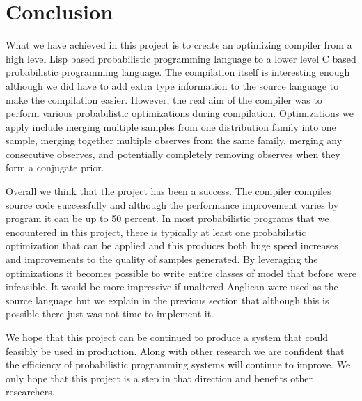 \documentclass[a4paper]{article}
\begin{document}

\section{Conclusion}

What we have achieved in this project is to create an optimizing compiler from a high level Lisp based probabilistic programming language to a lower level C based probabilistic programming language. The compilation itself is interesting enough although we did have to add extra type information to the source language to make the compilation easier. However, the real aim of the compiler was to perform various probabilistic optimizations during compilation. Optimizations we apply include merging multiple samples from one distribution family into one sample, merging together multiple observes from the same family, merging any consecutive observes, and potentially completely removing observes when they form a conjugate prior.

Overall we think that the project has been a success. The compiler compiles source code successfully and although the performance improvement varies by program it can be up to 50 percent. In most probabilistic programs that we encountered in this project, there is typically at least one probabilistic optimization that can be applied and this produces both huge speed increases and improvements to the quality of samples generated. By leveraging the optimizations it becomes possible to write entire classes of model that before were infeasible. It would be more impressive if unaltered Anglican were used as the source language but we explain in the previous section that although this is possible there just was not time to implement it.

We hope that this project can be continued to produce a system that could feasibly be used in production. Along with other research we are confident that the efficiency of probabilistic programming systems will continue to improve. We only hope that this project is a step in that direction and benefits other researchers.



{}

\end{document}
